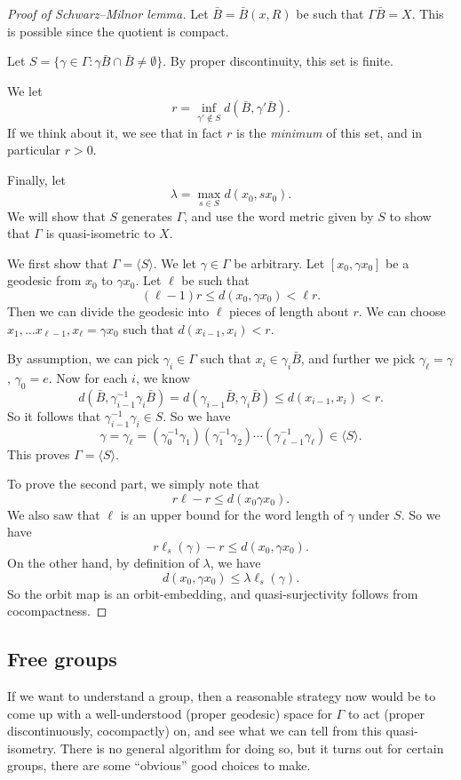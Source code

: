 \documentclass[a4paper]{article}
\begin{document}
\begin{proof}[Proof of Schwarz--Milnor lemma]
  Let $\bar{B} = \bar{B}(x, R)$ be such that $\Gamma \bar{B} = X$. This is possible since the quotient is compact.

  Let $S = \{\gamma \in \Gamma: \gamma \bar{B} \cap \bar{B} \not=\emptyset\}$. By proper discontinuity, this set is finite.

  We let
  \[
    r = \inf_{\gamma' \not \in S} d(\bar{B}, \gamma' \bar{B}).
  \]
  If we think about it, we see that in fact $r$ is the \emph{minimum} of this set, and in particular $r > 0$.

  Finally, let
  \[
    \lambda = \max_{s \in S} d(x_0, s x_0).
  \]
  We will show that $S$ generates $\Gamma$, and use the word metric given by $S$ to show that $\Gamma$ is quasi-isometric to $X$.

  We first show that $\Gamma = \langle S\rangle$. We let $\gamma \in \Gamma$ be arbitrary. Let $[x_0, \gamma x_0]$ be a geodesic from $x_0$ to $\gamma x_0$. Let $\ell$ be such that
  \[
    (\ell - 1)r \leq d(x_0, \gamma x_0) < \ell r.
  \]
  Then we can divide the geodesic into $\ell$ pieces of length about $r$. We can choose $x_1, \ldots x_{\ell - 1}, x_\ell = \gamma x_0$ such that $d(x_{i - 1}, x_i) < r$.

  By assumption, we can pick $\gamma_i \in \Gamma$ such that $x_i \in \gamma_i \bar{B}$, and further we pick $\gamma_\ell = \gamma$, $\gamma_0 = e$. Now for each $i$, we know
  \[
    d(\bar{B}, \gamma_{i -1 }^{-1} \gamma_i \bar{B}) = d(\gamma_{i - 1} \bar{B}, \gamma_i \bar{B}) \leq d(x_{i - 1}, x_i) < r.
  \]
  So it follows that $\gamma_{i - 1}^{-1} \gamma_i \in S$. So we have
  \[
    \gamma = \gamma_\ell = (\gamma_0^{-1} \gamma_1) (\gamma_1^{-1}\gamma_2) \cdots (\gamma_{\ell - 1}^{-1}\gamma_\ell) \in \langle S\rangle.
  \]
  This proves $\Gamma = \langle S \rangle$.

  To prove the second part, we simply note that
  \[
    r\ell - r \leq d (x_0 \gamma x_0).
  \]
  We also saw that $\ell$ is an upper bound for the word length of $\gamma$ under $S$. So we have
  \[
    r \ell_s(\gamma) - r \leq d(x_0, \gamma x_0).
  \]
  On the other hand, by definition of $\lambda$, we have
  \[
    d(x_0, \gamma x_0) \leq \lambda \ell_s(\gamma).
  \]
  So the orbit map is an orbit-embedding, and quasi-surjectivity follows from cocompactness.
\end{proof}


\subsection{Free groups}
If we want to understand a group, then a reasonable strategy now would be to come up with a well-understood (proper geodesic) space for $\Gamma$ to act (proper discontinuously, cocompactly) on, and see what we can tell from this quasi-isometry. There is no general algorithm for doing so, but it turns out for certain groups, there are some ``obvious'' good choices to make.
\end{document}
